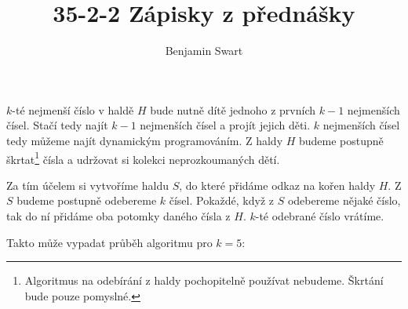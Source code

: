 \documentclass{article}
\title{35-2-2 Zápisky z přednášky}
\author{Benjamin Swart}
\begin{document}
\maketitle

$k$-té nejmenší číslo v haldě $H$ bude nutně dítě jednoho z prvních $k-1$ nejmenších čísel. Stačí tedy najít $k-1$ nejmenších čísel a projít jejich děti. $k$ nejmenších čísel tedy můžeme najít dynamickým programováním. Z haldy $H$ budeme postupně škrtat\footnote{Algoritmus na odebírání z haldy pochopitelně používat nebudeme. Škrtání bude pouze pomyslné.} čísla a udržovat si kolekci neprozkoumaných dětí.

Za tím účelem si vytvoříme haldu $S$, do které přidáme odkaz na kořen haldy $H$. Z $S$ budeme postupně odebereme $k$ čísel. Pokaždé, když z $S$ odebereme nějaké číslo, tak do ní přidáme oba potomky daného čísla z $H$. $k$-té odebrané číslo vrátíme.

Takto může vypadat průběh algoritmu pro $k=5$:
\end{document}
